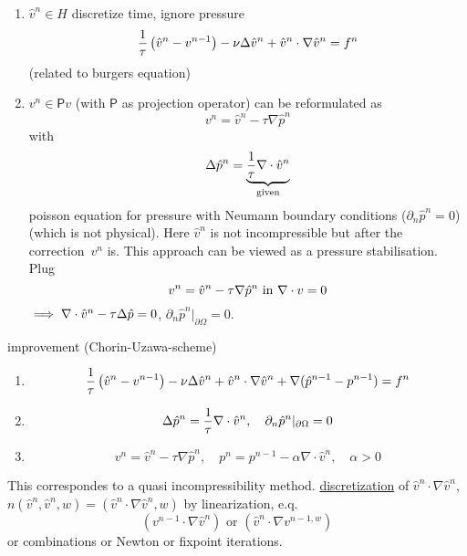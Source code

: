 \begin{enumerate}[label = \roman*)]
	\item $\hat{v}^n \in H$ discretize time, ignore pressure
	\begin{equation*}
		\frac{1}{\tau} \left( \hat{v}^n - v^{n-1} \right)- \nu \Delta \hat{v}^n + \hat{v}^n \cdot \nabla \hat{v}^n = f^n
	\end{equation*}(related to burgers equation)
	\item $v^n \in \mathsf{P}v$ (with $\mathsf{P}$ as projection operator) can be reformulated as 
	\begin{equation*}
		v^n = \hat{v}^n - \tau \nabla \hat{p}^n
	\end{equation*}
	with 
	\begin{equation*}
		\Delta \hat{p}^n = \underbrace{\frac{1}{\tau} \nabla \cdot \hat{v}^n }_{\text{given}}
	\end{equation*}
	poisson equation for pressure with Neumann boundary conditions ($\partial_n \hat{p}^n =0$)(which is not physical).
	Here $\hat{v}^n$ is not incompressible but after the \glqq correction\grqq \ $v^n$ is. This approach can be viewed as a pressure stabilisation. Plug 
	\begin{equation*}
		v^n = \hat{v}^n - \tau \nabla \hat{p}^n \text{ in } \nabla \cdot v =0
	\end{equation*}
	$\implies \nabla \cdot \hat{v}^n - \tau \Delta \hat{p} = 0$, $\partial_n \hat{p}^n|_{\partial\Omega}=0$. 
\end{enumerate}
improvement (Chorin-Uzawa-scheme)
\begin{enumerate}[label = \roman*)]
	\item 
	\begin{equation*}
		\frac{1}{\tau} \left( \hat{v}^n - v^{n-1} \right)- \nu \Delta \hat{v}^n + \hat{v}^n \cdot \nabla \hat{v}^n + \nabla ( \hat{p}^{n-1} - p^{n-1})= f^n
	\end{equation*}
	\item 
	\begin{equation*}
		\Delta \hat{p}^n = \frac{1}{\tau} \nabla \cdot \hat{v}^n ,\quad \partial_n \hat{p}^n|_{\partial \Omega} =0
	\end{equation*}
	\item 
	\begin{equation*}
		v^n = \hat{v}^n - \tau \nabla \hat{p}^n, \quad p^n =p^{n-1} - \alpha \nabla \cdot \hat{v}^n ,\quad \alpha >0
	\end{equation*}
\end{enumerate}
This correspondes to a quasi incompressibility method.\nl
\underline{discretization} of $\hat{v}^n \cdot \nabla \hat{v}^n$, $n(\hat{v}^n,\hat{v}^n,w) = (\hat{v}^n\cdot \nabla \hat{v}^n ,w)$ by linearization, e.q.
\begin{equation*}
	(v^{n-1}\cdot \nabla \hat{v}^n) \text{ or } (\hat{v}^n \cdot \nabla v^{n-1,w}) 
\end{equation*}
or combinations or Newton or fixpoint iterations.

